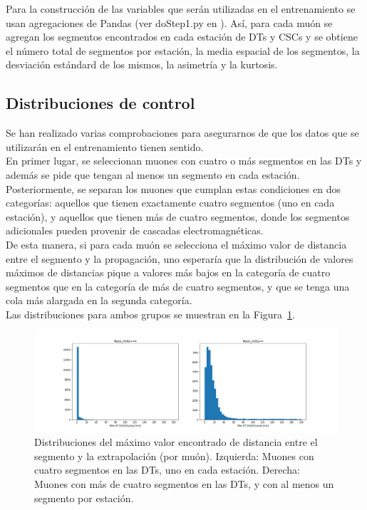 Para la construcci\'on de las variables que ser\'an utilizadas en el entrenamiento se usan agregaciones de Pandas (ver doStep1.py en \cite{processor}). As\'i, para cada mu\'on se agregan los segmentos encontrados en cada estaci\'on de DTs y CSCs y se obtiene el n\'umero total de segmentos por estaci\'on, la media espacial de los segmentos, la desviaci\'on est\'andard de los mismos, la asimetr\'ia y la kurtosis.



\subsection{Distribuciones de control}\label{sec:plots}

Se han realizado varias comprobaciones para asegurarnos de que los datos que se utilizar\'an en el entrenamiento tienen sentido. \\

En primer lugar, se seleccionan muones con cuatro o m\'as segmentos en las DTs y adem\'as se pide que tengan al menos un segmento en cada estaci\'on. Posteriormente, se separan los muones que cumplan estas condiciones en dos categor\'ias: aquellos que tienen exactamente cuatro segmentos (uno en cada estaci\'on), y aquellos que tienen m\'as de cuatro segmentos, donde los segmentos adicionales pueden provenir de cascadas electromagn\'eticas. \\
De esta manera, si para cada mu\'on se selecciona el m\'aximo valor de distancia entre el segmento y la propagaci\'on, uno esperar\'ia que la distribuci\'on de valores m\'aximos de distancias pique a valores m\'as bajos en la categor\'ia de cuatro segmentos que en la categor\'ia de m\'as de cuatro segmentos, y que se tenga una cola m\'as alargada en la segunda categor\'ia. \\
Las distribuciones para ambos grupos se muestran en la Figura~\ref{fig:data_dist}. \\

\begin{figure}[h]
\centering
\includegraphics[width=1.1\textwidth]{figures/data_simple_dist_postCleaning.png}
\caption{Distribuciones del m\'aximo valor encontrado de distancia entre el segmento y la extrapolaci\'on (por mu\'on). Izquierda: Muones con cuatro segmentos en las DTs, uno en cada estaci\'on. Derecha: Muones con m\'as de cuatro segmentos en las DTs, y con al menos un segmento por estaci\'on.}
\label{fig:data_dist}        
\end{figure}


